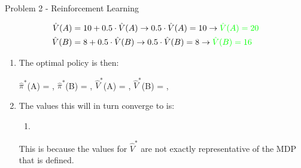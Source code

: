 \begin{problem}{Problem 2 - Reinforcement Learning}
\begin{highlight}
\begin{enumerate}[label=(\alph*)]
            \begin{align*}
                \hat{V}(A) & = 10 + 0.5 \cdot \hat{V}(A) \rightarrow 0.5 \cdot \hat{V}(A) = 10 \rightarrow \color{green}{\hat{V}(A) = 20} \\
                \hat{V}(B) & = 8 + 0.5 \cdot \hat{V}(B) \rightarrow 0.5 \cdot \hat{V}(B) = 8 \rightarrow \color{green}{\hat{V}(B) = 16}
            \end{align*}
            \begin{enumerate}[label=(\roman*)]
                \item The optimal policy is then:
                \begin{center}
                    $\hat{\pi}^{*}$(A) = \underline{\color{green}{Up}}, \hspace*{2pt} $\hat{\pi}^{*}$(B) = \underline{\color{green}{Down}}, \hspace*{2pt} $\hat{V}^{*}$(A) = \underline{\color{green}{20}}, \hspace*{2pt} $\hat{V}^{*}$(B) = \underline{\color{green}{16}}, \hspace*{2pt}
                \end{center}
                \item The values this will in turn converge to is:
                \begin{enumerate}[label=\(\circ\)]
                    \item {}
                \end{enumerate}
                This is because the values for $\hat{V}^{*}$ are not exactly representative of the MDP that is defined.
            \end{enumerate}
        \end{enumerate}
    \end{highlight}
\end{problem}

